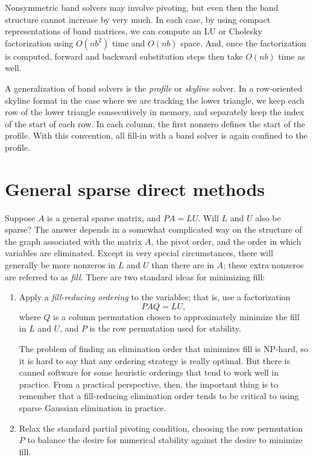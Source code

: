 \documentclass[12pt, leqno]{article} %
\begin{document}
Nonsymmetric band solvers may involve pivoting, but even then the band
structure cannot increase by very much.  In each case, by using
compact representations of band matrices, we can compute an LU or
Cholesky factorization using $O(nb^2)$ time and $O(nb)$ space.  And,
once the factorization is computed, forward and backward substitution
steps then take $O(nb)$ time as well.

A generalization of band solvers is the {\em profile} or {\em skyline}
solver.  In a row-oriented skyline format in the case where we are tracking the
lower triangle, we keep each row of the lower triangle consecutively
in memory, and separately keep the index of the start of each row.
In each column, the first nonzero defines the start of the profile.
With this convention, all fill-in with a band solver is again confined
to the profile.

\section{General sparse direct methods}

Suppose $A$ is a general sparse matrix, and $PA = LU$.  Will $L$ and $U$ also
be sparse?  The answer depends in a somewhat complicated way on the
structure of the graph associated with the matrix $A$, the pivot
order, and the order in which variables are eliminated.  Except in
very special circumstances, there will generally be more nonzeros in
$L$ and $U$ than there are in $A$; these extra nonzeros are referred
to as {\em fill}.  There are two standard ideas for minimizing fill:
\begin{enumerate}
\item
  Apply a {\em fill-reducing ordering} to the variables; that is,
  use a factorization
  \[
    PAQ = LU,
  \]
  where $Q$ is a column permutation chosen to approximately minimize
  the fill in $L$ and $U$, and $P$ is the row permutation used for
  stability.

  The problem of finding an elimination order that minimizes fill is
  NP-hard, so it is hard to say that any ordering strategy is really
  optimal.  But there is canned software for some heuristic orderings
  that tend to work well in practice.  From a practical perspective,
  then, the important thing is to remember that a fill-reducing
  elimination order tends to be critical to using sparse Gaussian
  elimination in practice.
\item
  Relax the standard partial pivoting condition, choosing the row
  permutation $P$ to balance the desire for numerical stability
  against the desire to minimize fill.
\end{enumerate}
\end{document}
